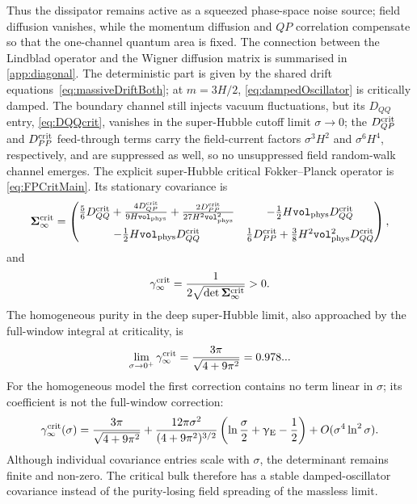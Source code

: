 \documentclass{article}
\newcommand{\Vphys}{\mathtt{vol}_{\rm phys}}
\numberwithin{equation}{section}
\begin{document}
	Thus the dissipator remains active as a squeezed phase-space noise source; field diffusion vanishes, while the momentum diffusion and \(QP\) correlation compensate so that the one-channel quantum area is fixed. The connection between the Lindblad operator and the Wigner diffusion matrix is summarised in \cref{app:diagonal}. The deterministic part is given by the shared drift equations~\eqref{eq:massiveDriftBoth}; at \(m=3H/2\), \cref{eq:dampedOscillator} is critically damped. The boundary channel still injects vacuum fluctuations, but its \(D_{QQ}\) entry, \cref{eq:DQQcrit}, vanishes in the super-Hubble cutoff limit $\sigma\to 0$; the \(D_{QP}^{\rm crit}\) and \(D_{PP}^{\rm crit}\) feed-through terms carry the field-current factors \(\sigma^3H^2\) and \(\sigma^6H^4\), respectively, and are suppressed as well, so no unsuppressed field random-walk channel emerges. The explicit super-Hubble critical Fokker--Planck operator is \cref{eq:FPCritMain}. Its stationary covariance is
	\begin{equation}
		\mathbf{\Sigma}_\infty^{\rm crit}
		=
		\begin{pmatrix}
			\frac56D_{QQ}^{\rm crit}
			+\frac{4D_{QP}^{\rm crit}}{9H\Vphys}
			+\frac{2D_{PP}^{\rm crit}}{27H^2\Vphys^2}
			&
			-\frac12H\Vphys D_{QQ}^{\rm crit}
			\\[8pt]
			-\frac12H\Vphys D_{QQ}^{\rm crit}
			&
			\frac16D_{PP}^{\rm crit}
			+\frac38H^2\Vphys^2D_{QQ}^{\rm crit}
		\end{pmatrix},
		\label{eq:CriticalStationaryCovMain}
	\end{equation}
	and
	\begin{equation}
		\gamma_\infty^{\rm crit}
		=
		\frac{1}{2\sqrt{\det\mathbf{\Sigma}_\infty^{\rm crit}}}>0 .
		\label{eq:CriticalPurityMain}
	\end{equation}
	The homogeneous purity in the deep super-Hubble limit, also approached by the full-window integral at criticality, is
	\begin{equation}
		\lim_{\sigma\to0^+}\gamma_\infty^{\rm crit}
		=
		\frac{3\pi}{\sqrt{4+9\pi^2}} = 0.978...
		\label{eq:CriticalPurityLimitMain}
	\end{equation}
	For the homogeneous model the first correction contains no term linear in \(\sigma\); its coefficient is not the full-window correction:
	\begin{equation}
		\gamma_\infty^{\rm crit}(\sigma)
		=
		\frac{3\pi}{\sqrt{4+9\pi^2}}
		+
		\frac{12\pi\sigma^2}{(4+9\pi^2)^{3/2}}
		\left(
		\ln\frac{\sigma}{2}
		+\upgamma_{\rm E}
		-\frac12
		\right)
		+O(\sigma^4\ln^2\sigma).
		\label{eq:CriticalPurityFirstCorrectionMain}
	\end{equation}
	Although individual covariance entries scale with \(\sigma\), the determinant remains finite and non-zero. The critical bulk therefore has a stable damped-oscillator covariance instead of the purity-losing field spreading of the massless limit.
\end{document}
